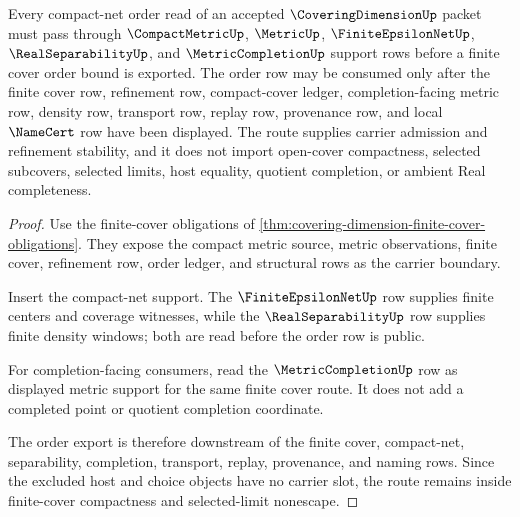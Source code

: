 \begin{theorem}
\label{thm:covering-dimension-compact-net-order-route}
Every compact-net order read of an accepted $\CoveringDimensionUp$ packet must pass through $\CompactMetricUp$, $\MetricUp$, $\FiniteEpsilonNetUp$, $\RealSeparabilityUp$, and $\MetricCompletionUp$ support rows before a finite cover order bound is exported. The order row may be consumed only after the finite cover row, refinement row, compact-cover ledger, completion-facing metric row, density row, transport row, replay row, provenance row, and local $\NameCert$ row have been displayed. The route supplies carrier admission and refinement stability, and it does not import open-cover compactness, selected subcovers, selected limits, host equality, quotient completion, or ambient Real completeness.
\end{theorem}
\begin{proof}
Use the finite-cover obligations of \autoref{thm:covering-dimension-finite-cover-obligations}. They expose the compact metric source, metric observations, finite cover, refinement row, order ledger, and structural rows as the carrier boundary.

Insert the compact-net support. The $\FiniteEpsilonNetUp$ row supplies finite centers and coverage witnesses, while the $\RealSeparabilityUp$ row supplies finite density windows; both are read before the order row is public.

For completion-facing consumers, read the $\MetricCompletionUp$ row as displayed metric support for the same finite cover route. It does not add a completed point or quotient completion coordinate.

The order export is therefore downstream of the finite cover, compact-net, separability, completion, transport, replay, provenance, and naming rows. Since the excluded host and choice objects have no carrier slot, the route remains inside finite-cover compactness and selected-limit nonescape.
\end{proof}

